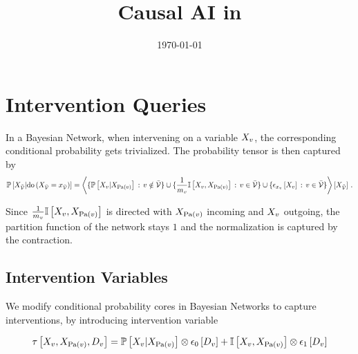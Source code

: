\documentclass[aps,onecolumn,nofootinbib,pra]{article}
\newcommand{\doof}[1]{\mathrm{do}\left(#1\right)}
\newcommand{\dovariable}{D}
\newcommand{\dovariableof}[1]{\dovariable_{#1}}
\begin{document}
    \title{Causal AI in \tnreason}

    \maketitle
    \date{\today}


    \section{Intervention Queries}

    In a Bayesian Network, when intervening on a variable $X_{v}$, the corresponding conditional probability gets trivialized.
    The probability tensor is then captured by
    \begin{align*}
        \condprobat{\catvariableof{\secnodes}}{\doof{\indexedcatvariableof{\thirdnodes}}}
        = \contractionof{
            \{\condprobof{\catvariableof{\node}}{\catvariableof{\parentsof{\node}}} \,:\, \node\notin\thirdnodes \}
            \cup \{\frac{1}{\catdimof{\node}} \onesat{\catvariableof{\node},\catvariableof{\parentsof{\node}}} \,:\, \node\in\thirdnodes\}
            \cup \{\onehotmapofat{\catindexof{\node}}{\catvariableof{\node}} \,:\, \node\in\thirdnodes\}
        }{\catvariableof{\secnodes}} \, .
    \end{align*}

    Since $\frac{1}{m_{v}} \mathbb{I}\left[X_{v},X_{\mathrm{Pa}(v)}\right]$ is directed with $X_{\mathrm{Pa}(v)}$ incoming and $X_{v}$ outgoing, the partition function of the network stays $1$ and the normalization is captured by the contraction.

    \subsection{Intervention Variables}

    We modify conditional probability cores in Bayesian Networks to capture interventions, by introducing intervention variable

    \begin{align*}
        \hypercoreat{\catvariableof{\node},\catvariableof{\parentsof{\node}},\dovariableof{\node}}
        = \condprobat{\catvariableof{\node}}{\catvariableof{\parentsof{\node}}} \otimes \onehotmapofat{0}{\dovariableof{\node}}
        + \onesat{\catvariableof{\node},\catvariableof{\parentsof{\node}}} \otimes \onehotmapofat{1}{\dovariableof{\node}}
    \end{align*}
\end{document}
